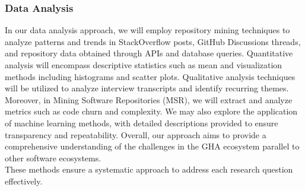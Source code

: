 \documentclass[conference]{IEEEtran}
\begin{document}
        \subsubsection{\textbf{Data Analysis}}
            In our data analysis approach, we will employ repository mining techniques to analyze patterns and trends in StackOverflow posts, GitHub Discussions threads, and repository data obtained through APIs and database queries. Quantitative analysis will encompass descriptive statistics such as mean and visualization methods including histograms and scatter plots. Qualitative analysis techniques will be utilized to analyze interview transcripts and identify recurring themes. Moreover, in Mining Software Repositories (MSR), we will extract and analyze metrics such as code churn and complexity. We may also explore the application of machine learning methods, with detailed descriptions provided to ensure transparency and repeatability. Overall, our approach aims to provide a comprehensive understanding of the challenges in the GHA ecosystem parallel to other software ecosystems.\\

        These methods ensure a systematic approach to address each research question effectively.\\
\end{document}
